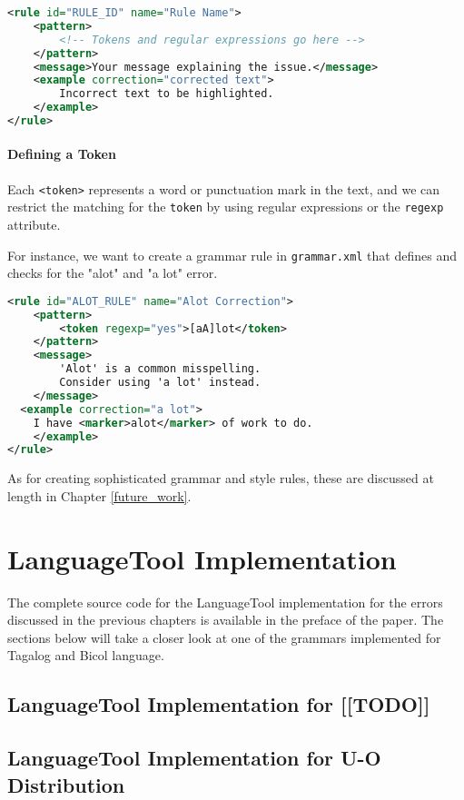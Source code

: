 \begin{lstlisting}[language=XML, caption=Boilerplate Code for a Simple Rule]
<rule id="RULE_ID" name="Rule Name">
    <pattern>
        <!-- Tokens and regular expressions go here -->
    </pattern>
    <message>Your message explaining the issue.</message>
    <example correction="corrected text">
        Incorrect text to be highlighted.
    </example>
</rule>    
\end{lstlisting}

\paragraph{Defining a Token} Each \texttt{<token>} represents a word or punctuation mark in the text, and we can restrict the matching for the \texttt{token} by using regular expressions or the \texttt{regexp} attribute.

For instance, we want to create a grammar rule in \texttt{grammar.xml} that defines and checks for the "alot" and "a lot" error.

\begin{lstlisting}[language= XML, caption=Example Grammar Rule for "alot" v. "a lot"]
<rule id="ALOT_RULE" name="Alot Correction">
    <pattern>
        <token regexp="yes">[aA]lot</token>
    </pattern>
    <message>
        'Alot' is a common misspelling. 
        Consider using 'a lot' instead.
    </message>
  <example correction="a lot">
    I have <marker>alot</marker> of work to do.
    </example>
</rule>
\end{lstlisting}


As for creating sophisticated grammar and style rules, these are discussed at length in Chapter \ref{future_work}.

\section{LanguageTool Implementation}

The complete source code for the LanguageTool implementation for the errors discussed in the previous chapters is available in the preface of the paper. The sections below will take a closer look at one of the grammars implemented for Tagalog and Bicol language.


\subsection{LanguageTool Implementation for [[TODO]]}

\subsection{LanguageTool Implementation for U-O Distribution}